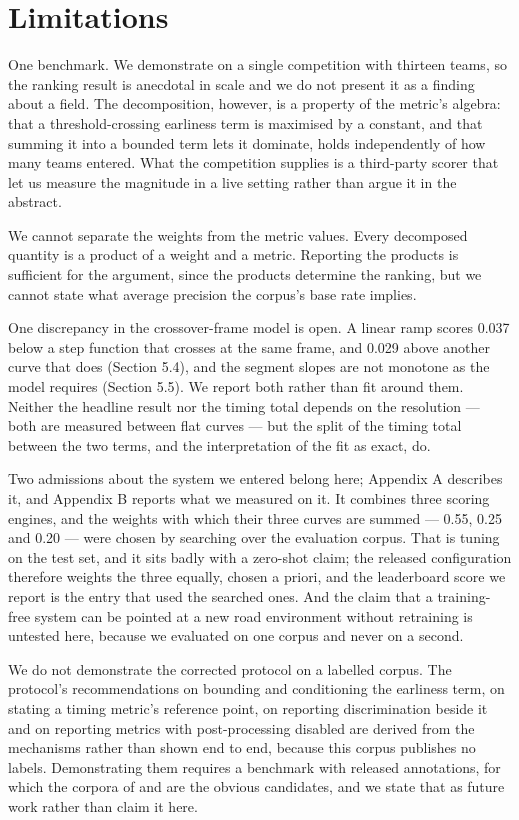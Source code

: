 \section{Limitations}

One benchmark. We demonstrate on a single competition with thirteen teams, so the ranking result is anecdotal in scale and we do not present it as a finding about a field. The decomposition, however, is a property of the metric's algebra: that a threshold-crossing earliness term is maximised by a constant, and that summing it into a bounded term lets it dominate, holds independently of how many teams entered. What the competition supplies is a third-party scorer that let us measure the magnitude in a live setting rather than argue it in the abstract.

We cannot separate the weights from the metric values. Every decomposed quantity is a product of a weight and a metric. Reporting the products is sufficient for the argument, since the products determine the ranking, but we cannot state what average precision the corpus's base rate implies.

One discrepancy in the crossover-frame model is open. A linear ramp scores 0.037 below a step function that crosses at the same frame, and 0.029 above another curve that does (Section 5.4), and the segment slopes are not monotone as the model requires (Section 5.5). We report both rather than fit around them. Neither the headline result nor the timing total depends on the resolution --- both are measured between flat curves --- but the split of the timing total between the two terms, and the interpretation of the fit as exact, do.

Two admissions about the system we entered belong here; Appendix A describes it, and Appendix B reports what we measured on it. It combines three scoring engines, and the weights with which their three curves are summed --- 0.55, 0.25 and 0.20 --- were chosen by searching over the evaluation corpus. That is tuning on the test set, and it sits badly with a zero-shot claim; the released configuration therefore weights the three equally, chosen a priori, and the leaderboard score we report is the entry that used the searched ones. And the claim that a training-free system can be pointed at a new road environment without retraining is untested here, because we evaluated on one corpus and never on a second.

We do not demonstrate the corrected protocol on a labelled corpus. The protocol's recommendations on bounding and conditioning the earliness term, on stating a timing metric's reference point, on reporting discrimination beside it and on reporting metrics with post-processing disabled are derived from the mechanisms rather than shown end to end, because this corpus publishes no labels. Demonstrating them requires a benchmark with released annotations, for which the corpora of \citet{chan2016dad} and \citet{bao2020ccd} are the obvious candidates, and we state that as future work rather than claim it here.

